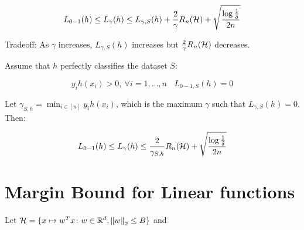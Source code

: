 \begin{remark}
    
    \[
        L_{0-1} (h) \leq L_\gamma (h) \leq L_{\gamma, S} (h) + \frac{2}{\gamma} R_n (\mathcal{H}) + 
        \sqrt{ \frac{\log \frac{1}{\delta}}{2n}  }  
    \]

    Tradeoff: As \(\gamma\) increases, \(L_{\gamma, S} (h)\) increases but 
    \(\frac{2}{\gamma} R_n (\mathcal{H})\) decreases. 
\end{remark}

Assume that \(h\) perfectly classifies the dataset \(S\): 

\[
    y_i h(x_i) > 0, \ \forall i = 1, \ldots, n \ \ \ \ L_{0-1, S} (h) = 0 
\]

Let \(\gamma_{S,h} = \min_{i \in [n]} y_i h(x_i)\), which is the maximum \(\gamma\) 
such that \(L_{\gamma, S}(h) = 0\). Then: 

\[
    L_{0-1} (h) \leq L_\gamma (h) \leq  \frac{2}{\gamma_{S,h}} R_n (\mathcal{H}) + 
     \sqrt{ \frac{\log \frac{1}{\delta}}{2n}  }  
\]



\section{Margin Bound for Linear functions}

\begin{theorem}
    Let \(\mathcal{H} = \{ x \mapsto  w^T x \colon w \in \mathbb{R}^d, \norm{w}_2 \leq B\}\) and 
    
\end{theorem}